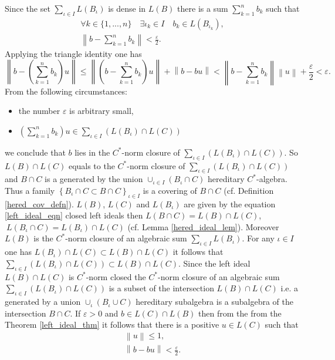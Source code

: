 \documentclass{beamer}
\theoremstyle{plain}
\newcommand{\bean}{\begin{eqnarray*}}
\newcommand{\eean}{\end{eqnarray*}}
\newcommand{\eps}{\varepsilon}                    %
\begin{document}
\begin{frame}

 Since the set $\sum_{\iota\in I}  L\left(B_\iota\right)$ is dense in $L\left(B\right)$ there is a sum $\sum_{k = 1}^n b_{k}$ such that
 \bean
 \forall k\in \{1,..., n\}\quad \exists \iota_k\in I \quad b_k \in L\left( B_{\iota_k}\right)  ,\\
 \left\|b - \sum_{k = 1}^n b_k \right\|< \frac{\eps}{2}.
 \eean
 Applying the triangle identity one has
 $$
 \left\|b -  \left( \sum_{k = 1}^n b_k\right)  u\right\|	\le 	\left\|\left( b -   \sum_{k = 1}^n b_k\right)  u\right\|+ \left\|b -   b  u\right\|< \left\| b -   \sum_{k = 1}^n b_k\right\|\left\|  u\right\|+ \frac{\eps}{2}< \eps.
 $$
 From the following circumstances:
 \begin{itemize}
 	\item  the number $\eps$ is arbitrary small,
 	\item $\left( \sum_{k = 1}^n b_k\right)  u\in \sum_{\iota\in I} \left( L\left(B_\iota\right)\cap L\left(C\right)\right)$
 \end{itemize}
 we conclude that $b$ lies in the $C^*$-norm closure of $\sum_{\iota\in I} \left( L\left(B_\iota\right)\cap L\left(C\right)\right)$. So $L\left(B\right)\cap L\left(C\right)$ equals to the $C^*$-norm closure of $\sum_{\iota\in I} \left( L\left(B_\iota\right)\cap L\left(C\right)\right)$ and $B\cap C$ is a generated by the union $\cup_{\iota\in I} \left(B_\iota\cap C \right)$ hereditary $C^*$-algebra. Thus 
 a family $\left\{B_\iota\cap C \subset B\cap C\right\}_{\iota\in I}$ is a {covering} of $B\cap C$ (cf. Definition \ref{hered_cov_defn}). $L\left( B\right)$, $L\left( C\right)$ and $L\left( B_\iota \right)$ are given by the equation \eqref{left_ideal_eqn} closed left ideals then $L\left(B\cap C \right) = L(B)\cap L(C)$, $~L\left(B_\iota \cap C \right)= L\left(B_\iota \right)\cap L\left( C \right)$ (cf. Lemma \ref{hered_ideal_lem}). Moreover $L\left(B\right)$ is the $C^*$-norm closure of an algebraic sum $\sum_{\iota\in I} L\left( B_\iota\right)$. For any $\iota \in I$ one has $L\left(B_\iota\right)\cap L\left(C\right)\subset L\left(B\right)\cap L\left(C\right)$ it follows that $\sum_{\iota\in I} \left( L\left(B_\iota\right)\cap L\left(C\right)\right) \subset L\left(B\right)\cap L\left(C\right)$. Since the left ideal  $L\left(B\right)\cap L\left(C\right)$ is $C^*$-norm closed the $C^*$-norm closure of an algebraic sum $\sum_{\iota\in I} \left( L\left(B_\iota\right)\cap L\left(C\right)\right)$ is a subset of  the intersection $L\left(B\right)\cap L\left(C\right)$ i.e. a generated by a union $\cup_\iota \left( B_\iota\cup C\right)$ hereditary subalgebra is a subalgebra of the intersection $B\cap C$. If $\eps > 0$ and $ b\in L\left(C\right)\cap L\left(B\right)$ then from the from the Theorem \ref{left_ideal_thm} it follows that there is a positive $u \in L\left(C\right)$ such that 
 \bean
 \left\|u \right\| \le 1,\\
 \left\|b - b u\right\|< \frac{\eps}{2}.
 \eean 
\end{frame}
\end{document}

